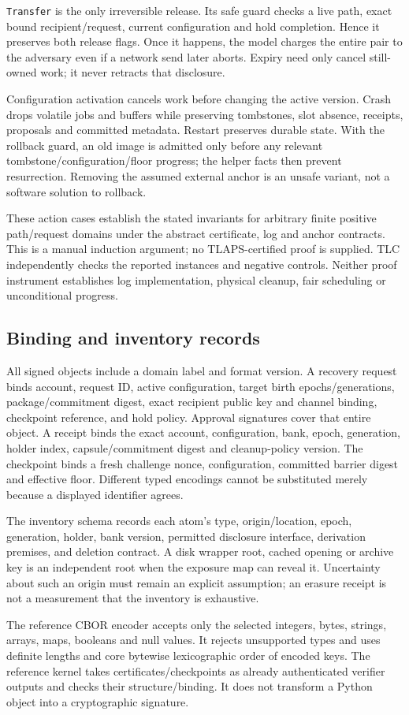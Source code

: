 \documentclass[pdflatex,sn-mathphys-num]{sn-jnl}
\theoremstyle{plain}
\theoremstyle{definition}
\newcommand{\code}[1]{\texttt{#1}}
\begin{document}
\begin{appendices}
\code{Transfer} is the only irreversible release. Its safe guard checks a live path, exact bound recipient/request, current configuration and hold completion. Hence it preserves both release flags. Once it happens, the model charges the entire pair to the adversary even if a network send later aborts. Expiry need only cancel still-owned work; it never retracts that disclosure.

Configuration activation cancels work before changing the active version. Crash drops volatile jobs and buffers while preserving tombstones, slot absence, receipts, proposals and committed metadata. Restart preserves durable state. With the rollback guard, an old image is admitted only before any relevant tombstone/configuration/floor progress; the helper facts then prevent resurrection. Removing the assumed external anchor is an unsafe variant, not a software solution to rollback.

These action cases establish the stated invariants for arbitrary finite positive path/request domains under the abstract certificate, log and anchor contracts. This is a manual induction argument; no TLAPS-certified proof is supplied. TLC independently checks the reported instances and negative controls. Neither proof instrument establishes log implementation, physical cleanup, fair scheduling or unconditional progress.

\subsection{Binding and inventory records}
All signed objects include a domain label and format version. A recovery request binds account, request ID, active configuration, target birth epochs/generations, package/commitment digest, exact recipient public key and channel binding, checkpoint reference, and hold policy. Approval signatures cover that entire object. A receipt binds the exact account, configuration, bank, epoch, generation, holder index, capsule/commitment digest and cleanup-policy version. The checkpoint binds a fresh challenge nonce, configuration, committed barrier digest and effective floor. Different typed encodings cannot be substituted merely because a displayed identifier agrees.

The inventory schema records each atom's type, origin/location, epoch, generation, holder, bank version, permitted disclosure interface, derivation premises, and deletion contract. A disk wrapper root, cached opening or archive key is an independent root when the exposure map can reveal it. Uncertainty about such an origin must remain an explicit assumption; an erasure receipt is not a measurement that the inventory is exhaustive.

The reference CBOR encoder accepts only the selected integers, bytes, strings, arrays, maps, booleans and null values. It rejects unsupported types and uses definite lengths and core bytewise lexicographic order of encoded keys. The reference kernel takes certificates/checkpoints as already authenticated verifier outputs and checks their structure/binding. It does not transform a Python object into a cryptographic signature.
\end{appendices}


\end{document}
